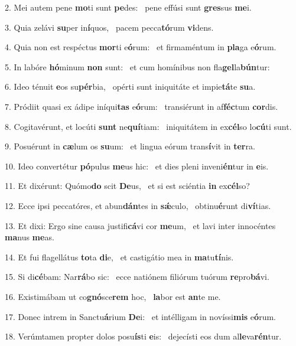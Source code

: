 2. Mei autem pene \textbf{mo}ti sunt \textbf{pe}des: \ast\  pene effúsi sunt \textbf{gres}sus \textbf{me}i.\

3. Quia zelávi \textbf{su}per in\textbf{í}quos, \ast\  pacem pecca\textbf{tó}rum \textbf{vi}dens.\

4. Quia non est respéctus \textbf{mor}ti e\textbf{ó}rum: \ast\  et firmaméntum in \textbf{pla}ga e\textbf{ó}rum.\

5. In labóre \textbf{hó}minum \textbf{non} sunt: \ast\  et cum homínibus non fla\textbf{gel}la\textbf{bún}tur:\

6. Ideo ténuit \textbf{e}os su\textbf{pér}bia, \ast\  opérti sunt iniquitáte et impie\textbf{tá}te \textbf{su}a.\

7. Pródiit quasi ex ádipe iníqui\textbf{tas} e\textbf{ó}rum: \ast\  transiérunt in af\textbf{féc}tum \textbf{cor}dis.\

8. Cogitavérunt, et locúti \textbf{sunt} ne\textbf{quí}tiam: \ast\  iniquitátem in ex\textbf{cél}so lo\textbf{cú}ti sunt.\

9. Posuérunt in \textbf{cæ}lum os \textbf{su}um: \ast\  et lingua eórum trans\textbf{í}vit in \textbf{ter}ra.\

10. Ideo convertétur \textbf{pó}pulus \textbf{me}us hic: \ast\  et dies pleni inveni\textbf{én}tur in \textbf{e}is.\

11. Et dixérunt: Quómo\textbf{do} scit \textbf{De}us, \ast\  et si est sciéntia \textbf{in} ex\textbf{cél}so?\

12. Ecce ipsi peccatóres, et abun\textbf{dán}tes in \textbf{sǽ}culo, \ast\  obtinu\textbf{é}runt di\textbf{ví}tias.\

13. Et dixi: Ergo sine causa justifi\textbf{cá}vi cor \textbf{me}um, \ast\  et lavi inter innocéntes \textbf{ma}nus \textbf{me}as.\

14. Et fui flagellátus \textbf{to}ta \textbf{di}e, \ast\  et castigátio mea in \textbf{ma}tu\textbf{tí}nis.\

15. Si di\textbf{cé}bam: Nar\textbf{rá}bo sic: \ast\  ecce natiónem filiórum tuórum \textbf{re}pro\textbf{bá}vi.\

16. Existimábam ut co\textbf{gnó}sce\textbf{rem} hoc, \ast\  \textbf{la}bor est \textbf{an}te me.\

17. Donec intrem in Sanctu\textbf{á}rium \textbf{De}i: \ast\  et intélligam in novíssi\textbf{mis} e\textbf{ó}rum.\

18. Verúmtamen propter dolos posu\textbf{ís}ti \textbf{e}is: \ast\  dejecísti eos dum al\textbf{le}va\textbf{rén}tur.\

